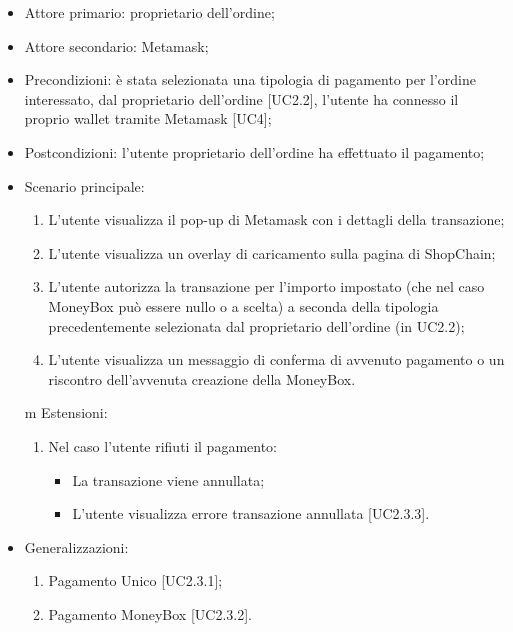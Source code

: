 \begin{itemize}
    \item Attore primario: proprietario dell'ordine;
    \item Attore secondario: Metamask\glo{};
    \item Precondizioni: è stata selezionata una tipologia di pagamento per l'ordine interessato, dal proprietario dell'ordine [UC2.2], 
            l'utente ha connesso il proprio wallet\glo{} tramite Metamask\glo{} [UC4];
    \item Postcondizioni: l'utente proprietario dell'ordine ha effettuato il pagamento;
    \item Scenario principale:
        \begin{enumerate}
            \item L'utente visualizza il pop-up di Metamask\glo{} con i dettagli della transazione;
            \item L'utente visualizza un overlay di caricamento sulla pagina di ShopChain;
            \item L'utente autorizza la transazione per l'importo impostato (che nel caso MoneyBox\glo{} può essere nullo o a scelta) a seconda della tipologia precedentemente selezionata dal proprietario dell'ordine (in UC2.2);
            \item L'utente visualizza un messaggio di conferma di avvenuto pagamento o un riscontro dell'avvenuta creazione della MoneyBox\glo{}.
        \end{enumerate}
    m Estensioni:
        \begin{enumerate}
            \item Nel caso l'utente rifiuti il pagamento:
            \begin{itemize}
                \item La transazione viene annullata;
                \item L'utente visualizza errore transazione annullata [UC2.3.3].
            \end{itemize}
        \end{enumerate}
    \item Generalizzazioni:
        \begin{enumerate}
            \item Pagamento Unico [UC2.3.1];
            \item Pagamento MoneyBox\glo{} [UC2.3.2].
        \end{enumerate}
\end{itemize}

